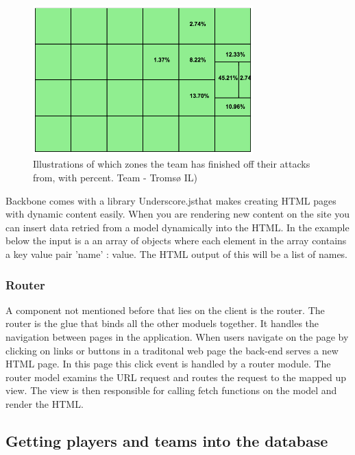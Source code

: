 \begin{figure}[ht!]
\centering
\includegraphics[width=85mm]{images/general/finishing_zones.png}
\caption{Illustrations of which zones the team has finished off their attacks from, with percent. Team - Tromsø IL)}
\label{fig:attacking_zones}
\end{figure}

Backbone comes with a library Underscore.js\footnotemark that makes creating HTML pages with dynamic content easily. When you are rendering new content on the site you can insert data retried from a model dynamically into the HTML. In the example below the input is a an array of objects where each element in the array contains a key value pair 'name' : value. The HTML output of this will be a list of names.




\subsubsection{Router}

A component not mentioned before that lies on the client is the router. The router is the glue that binds all the other moduels together. It handles the navigation between pages in the application. When users navigate on the page by clicking on links or buttons in a traditonal web page the back-end serves a new HTML page. In this page this click event is handled by a router module. The router model examins the URL request and routes the request to the mapped up view. The view is then responsible for calling fetch functions on the model and render the HTML.


\subsection{Getting players and teams into the database}

